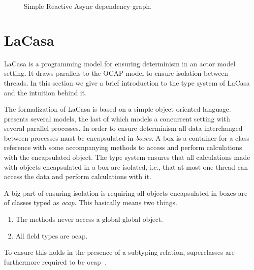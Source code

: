 \begin{figure}
  \centering
  \caption{Simple Reactive Async dependency graph.}
  \label{fig:ra_example}
\end{figure}



\section{LaCasa}\label{sec:lacasa}

LaCasa\parencite{conf/oopsla/HallerL16} is a programming model for ensuring
determinism in an actor model\parencite{actormodelref} setting. It draws
parallels to the OCAP model to ensure isolation between threads.  In this
section we give a brief introduction to the type system of LaCasa and the
intuition behind it.

The formalization of LaCasa is based on a simple object oriented language.
\textcite{conf/oopsla/HallerL16} presents several models, the last of which
models a concurrent setting with several parallel processes. In order to ensure
determinism all data interchanged between processes must be encapsulated in
\emph{boxes}. A box is a container for a class reference with some accompanying
methods to access and perform calculations with the encapsulated object. The
type system ensures that all calculations made with objects encapsulated in a box
are isolated, i.e., that at most one thread can access the data and perform
calculations with it.

A big part of ensuring isolation is requiring all objects encapsulated in boxes
are of classes typed as \emph{ocap}. This basically means two things.
\begin{enumerate}
  \item The methods never access a global global object.
  \item All field types are ocap.
\end{enumerate}
To ensure this holds in the presence of a subtyping relation, superclasses are
furthermore required to be ocap~\parencite{conf/oopsla/HallerL16}.

